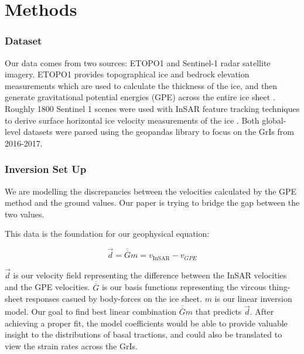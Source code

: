 \documentclass{article}
\begin{document}
\section{Methods}

\subsubsection{Dataset}
Our data comes from two sources: ETOPO1 and Sentinel-1 radar satellite imagery. ETOPO1 provides topographical ice and bedrock elevation measurements which are used to calculate the thickness of the ice, and then generate gravitational potential energies (GPE) across the entire ice sheet \cite{information_ncei_etopo1_nodate}. Roughly 1800 Sentinel 1 scenes were used with InSAR feature tracking techniques to derive surface horizontal ice velocity measurements of the ice \cite{nagler_sentinel-1_2015}. Both global-level datasets were parsed using the geopandas library to focus on the GrIs from 2016-2017. 



\subsubsection{Inversion Set Up}

We are modelling the discrepancies between the velocities calculated by the GPE method and the ground values. Our paper is trying to bridge the gap between the two values.


This data is the foundation for our geophysical equation:

$$
\vec{d}=\overline{\overline{G}} m=v_{\text {InSAR}}-v_{GPE}
$$


$\vec{d}$ is our velocity field representing the difference between the InSAR velocities and the GPE velocities. $\overline{\overline{G}}$ is our basis functions representing the vircous thing-sheet responses casued by body-forces on the ice sheet. $m$ is our linear inversion model. Our goal to find best linear combination $\overline{\overline{G}} m$ that predicts $\vec{d}$. After achieving a proper fit, the model coefficients would be able to provide valuable insight to the distributions of basal tractions, and could also be translated to view the strain rates across the GrIs.
\end{document}
